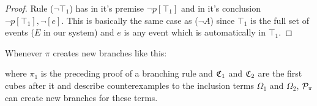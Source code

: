 \documentclass[a4paper,twoside,12pt, english]{article}
\begin{document}
\begin{proof}
Rule ($\neg \top_1$) has in it's premise $\neg p[\top_1]$ and in it's conclusion $\neg p[\top_1],\neg[e]$. This is basically the same case as ($\neg A$) since $\top_1$ is the full set of events ($E$ in our system) and $e$ is any event which is automatically in $\top_1$.
\end{proof}

\begin{lemma}\label{lem:branching}
Whenever $\pi$ creates new branches like this:
\begin{mathpar} 
\end{mathpar}
where $\pi_1$ is the preceding proof of a branching rule and $\mathfrak{C}_1$ and $\mathfrak{C}_2$ are the first cubes after it and describe counterexamples to the inclusion terms $\Omega_1$ and $\Omega_2$, $\mathcal{P}_\pi$ can create new branches for these terms.
\end{lemma}
\end{document}
